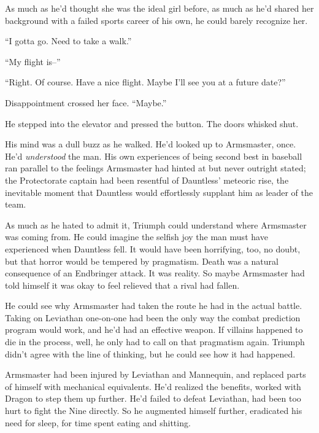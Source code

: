 As much as he'd thought she was the ideal girl before, as much as he'd shared her background with a failed sports career of his own, he could barely recognize her.



``I gotta go.  Need to take a walk.''



``My flight is--''



``Right.  Of course.  Have a nice flight.  Maybe I'll see you at a future date?''



Disappointment crossed her face.  ``Maybe.''



He stepped into the elevator and pressed the button.  The doors whisked shut.



His mind was a dull buzz as he walked.  He'd looked up to Armsmaster, once.  He'd \emph{understood} the man.  His own experiences of being second best in baseball ran parallel to the feelings Armsmaster had hinted at but never outright stated; the Protectorate captain had been resentful of Dauntless' meteoric rise, the inevitable moment that Dauntless would effortlessly supplant him as leader of the team.



As much as he hated to admit it, Triumph could understand where Armsmaster was coming from.  He could imagine the selfish joy the man must have experienced when Dauntless fell.  It would have been horrifying, too, no doubt, but that horror would be tempered by pragmatism.  Death was a natural consequence of an Endbringer attack.  It was reality.  So maybe Armsmaster had told himself it was okay to feel relieved that a rival had fallen.



He could see why Armsmaster had taken the route he had in the actual battle.  Taking on Leviathan one-on-one had been the only way the combat prediction program would work, and he'd had an effective weapon.  If villains happened to die in the process, well, he only had to call on that pragmatism again.  Triumph didn't agree with the line of thinking, but he could see how it had happened.



Armsmaster had been injured by Leviathan and Mannequin, and replaced parts of himself with mechanical equivalents.  He'd realized the benefits, worked with Dragon to step them up further.  He'd failed to defeat Leviathan, had been too hurt to fight the Nine directly.  So he augmented himself further, eradicated his need for sleep, for time spent eating and shitting.




